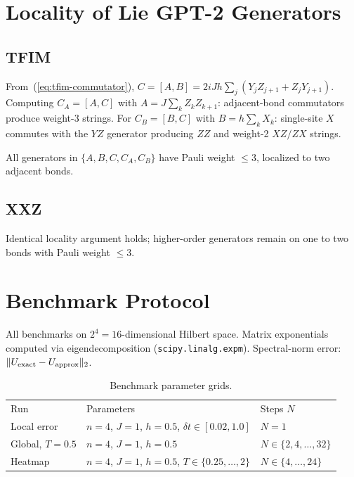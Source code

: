 \documentclass[aps,prxquantum,twocolumn,nofootinbib]{revtex4-2}
\begin{document}
\section{Locality of Lie GPT-2 Generators}
\label{app:locality}

\subsection{TFIM}

From~(\ref{eq:tfim-commutator}),
$C=[A,B]=2iJh\sum_j(Y_jZ_{j+1}+Z_jY_{j+1})$.
Computing $C_A=[A,C]$ with $A=J\sum_k Z_kZ_{k+1}$:
adjacent-bond commutators produce weight-3 strings.
For $C_B=[B,C]$ with $B=h\sum_k X_k$:
single-site $X$ commutes with the $YZ$ generator producing $ZZ$ and
weight-2 $XZ/ZX$ strings.

All generators in $\{A,B,C,C_A,C_B\}$ have Pauli weight $\leq 3$,
localized to two adjacent bonds.

\subsection{XXZ}

Identical locality argument holds; higher-order generators
remain on one to two bonds with Pauli weight $\leq 3$.

\section{Benchmark Protocol}
\label{app:protocol}

All benchmarks on $2^4=16$-dimensional Hilbert space.
Matrix exponentials computed via eigendecomposition
(\texttt{scipy.linalg.expm}).
Spectral-norm error: $\|U_{\rm exact}-U_{\rm approx}\|_2$.

\begin{table}[h]
  \caption{Benchmark parameter grids.}
  \label{tab:protocol}
  \begin{ruledtabular}
    \scriptsize
    \begin{tabular}{p{}p{}p{}}
      Run & Parameters & Steps $N$ \\
      \colrule
      Local error & $n{=}4$, $J{=}1$, $h{=}0.5$,
                    $\delta t\in[0.02,1.0]$ & $N=1$ \\
      Global, $T{=}0.5$ & $n{=}4$, $J{=}1$, $h{=}0.5$ &
        $N\in\{2,4,\ldots,32\}$ \\
      Heatmap & $n{=}4$, $J{=}1$, $h{=}0.5$,
                $T\in\{0.25,\ldots,2\}$ & $N\in\{4,\ldots,24\}$ \\
    \end{tabular}
  \end{ruledtabular}
\end{table}
\end{document}
